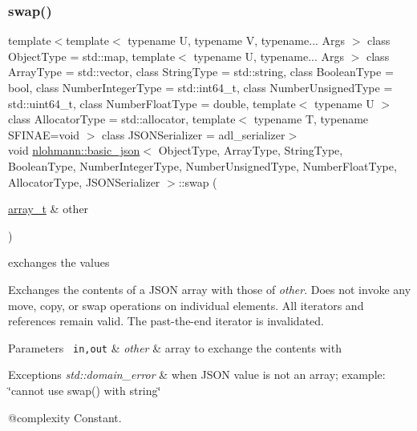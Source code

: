 \subsubsection{\texorpdfstring{swap()}{swap()}\hspace{0.1cm}{\footnotesize\ttfamily [2/4]}}
{\footnotesize\ttfamily template$<$template$<$ typename U, typename V, typename... Args $>$ class Object\+Type = std\+::map, template$<$ typename U, typename... Args $>$ class Array\+Type = std\+::vector, class String\+Type  = std\+::string, class Boolean\+Type  = bool, class Number\+Integer\+Type  = std\+::int64\+\_\+t, class Number\+Unsigned\+Type  = std\+::uint64\+\_\+t, class Number\+Float\+Type  = double, template$<$ typename U $>$ class Allocator\+Type = std\+::allocator, template$<$ typename T, typename S\+F\+I\+N\+A\+E=void $>$ class J\+S\+O\+N\+Serializer = adl\+\_\+serializer$>$ \\
void \mbox{\hyperlink{classnlohmann_1_1basic__json}{nlohmann\+::basic\+\_\+json}}$<$ Object\+Type, Array\+Type, String\+Type, Boolean\+Type, Number\+Integer\+Type, Number\+Unsigned\+Type, Number\+Float\+Type, Allocator\+Type, J\+S\+O\+N\+Serializer $>$\+::swap (\begin{DoxyParamCaption}\item[{\mbox{\hyperlink{classnlohmann_1_1basic__json_ae095578e03df97c5b3991787f1056374}{array\+\_\+t}} \&}]{other }\end{DoxyParamCaption})\hspace{0.3cm}{\ttfamily [inline]}}



exchanges the values 

Exchanges the contents of a J\+S\+ON array with those of {\itshape other}. Does not invoke any move, copy, or swap operations on individual elements. All iterators and references remain valid. The past-\/the-\/end iterator is invalidated.


\begin{DoxyParams}[1]{Parameters}
\mbox{\texttt{ in,out}}  & {\em other} & array to exchange the contents with\\
\hline
\end{DoxyParams}

\begin{DoxyExceptions}{Exceptions}
{\em std\+::domain\+\_\+error} & when J\+S\+ON value is not an array; example\+: {\ttfamily \char`\"{}cannot use swap() with string\char`\"{}}\\
\hline
\end{DoxyExceptions}
@complexity Constant.

